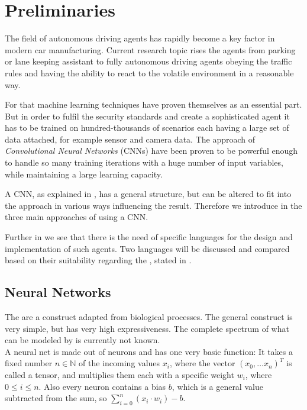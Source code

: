 \chapter{Preliminaries}

The field of autonomous driving agents has rapidly become a key factor in modern car manufacturing. Current research topic rises the agents from parking or lane keeping assistant to fully autonomous driving agents obeying the traffic rules and having the ability to react to the volatile environment in a reasonable way.

For that machine learning techniques have proven themselves as an essential part. But in order to fulfil the security standards and create a sophisticated agent it has to be trained on hundred-thousands of scenarios each having a large set of data attached, for example sensor and camera data.
The approach of \textit{Convolutional Neural Networks} (CNNs) have been proven to be powerful enough to handle so many training iterations with a huge number of input variables, while maintaining a large learning capacity. \cite{krizhevsky2012imagenet}

A CNN, as explained in , has a general structure, but can be altered to fit into the approach in various ways influencing the result. Therefore we introduce in  the three main approaches of using a CNN.

Further in  we see that there is the need of specific languages for the design and implementation of such agents. Two languages will be discussed and compared based on their suitability regarding the \alexnet, stated in  .

\section{Neural Networks}\label{sec: NN}

The \nns are a construct adapted from biological processes. The general construct is very simple, but has  very high expressiveness. The complete spectrum of what can be modeled by \nns is currently not known.\\
A neural net is made out of neurons and has one very basic function:
It takes a fixed number $n \in \mathbb{N}$ of the incoming values $x_i$, where the vector $(x_0,\dots x_n)^T$ is called a tensor, and multiplies them each with a specific weight $w_i$, where $0 \le i \le n$.
Also every neuron contains a bias $b$, which is a general value subtracted from the sum, so $\sum_{i=0}^{n} (x_i \cdot w_i) -b$. 

